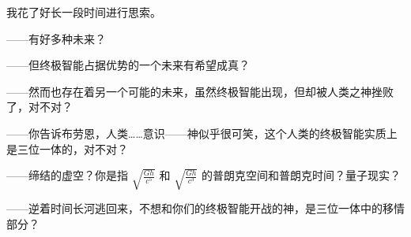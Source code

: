 \documentclass[AutoFakeBold=true]{book}
\begin{document}
{\heiti [嚇！]}

{}

\vspace*{1em}

我花了好长一段时间进行思索。

{\kaishu ——有好多种未来？}

{}

{\kaishu ——但终极智能占据优势的一个未来有希望成真？}

{\heiti [对]}

{\kaishu ——然而也存在着另一个可能的未来，虽然终极智能出现，但却被人类之神挫败了，对不对？}

{}

{\kaishu ——你告诉布劳恩，人类……意识——神似乎很可笑，这个人类的终极智能实质上是三位一体的，对不对？}

{\heiti [悟力/

移情/

缔结的虚空]}

\vspace*{1em}

{\kaishu ——缔结的虚空？你是指 $\sqrt{\frac{Gh}{c^5}}$ 和 $\sqrt{\frac{Gh}{c^3}}$ 的普朗克空间和普朗克时间？量子现实？}

{\heiti [留神/

济慈/

思考可以成为习惯]}

{\kaishu ——逆着时间长河逃回来，不想和你们的终极智能开战的神，是三位一体中的移情部分？}

{\heiti [对]}

{}
\end{document}
